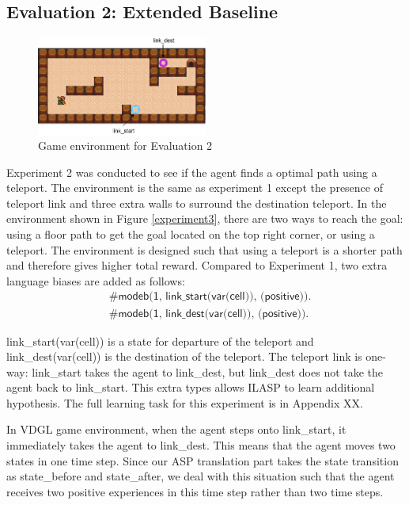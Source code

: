 \subsection{Evaluation 2: Extended Baseline}
\label{subsec:experiement2_setup}

\begin{figure}[!htb]
\centering
\includegraphics[width=0.5\textwidth]{./figures/experiment2_setup}
\caption{Game environment for Evaluation 2}
\label{experiment2}
\end{figure}
Experiment 2 was conducted to see if the agent finds a optimal path using a teleport. The environment is the same as experiment 1 except the presence of teleport link and three extra walls to surround the destination teleport.
In the environment shown in Figure \ref{experiment3},
there are two ways to reach the goal: using a floor path to get the goal located on the top right corner, or using a teleport.
The environment is designed such that using a teleport is a shorter path and therefore gives higher total reward.
Compared to Experiment 1, two extra language biases are added as follows:
\begin{equation*}
\begin{split}
&\textsf{\#modeb(1, link\_start(var(cell)), (positive)).}\\
&\textsf{\#modeb(1, link\_dest(var(cell)), (positive)).}
\end{split}
\end{equation*}

\textsf{link\_start(var(cell))} is a state for departure of the teleport and \textsf{link\_dest(var(cell))} is the destination of the teleport. 
The teleport link is one-way: \textsf{link\_start} takes the agent to \textsf{link\_dest}, but \textsf{link\_dest} does not take the agent back to \textsf{link\_start}.
This extra types allows ILASP to learn additional hypothesis.
The full learning task for this experiment is in Appendix XX.

In VDGL game environment, when the agent steps onto \textsf{link\_start}, it immediately takes the agent to \textsf{link\_dest}. This means that the agent moves two states in one time step.
Since our ASP translation part takes the state transition as \textsf{state\_before} and \textsf{state\_after}, 
we deal with this situation such that the agent receives two positive experiences in this time step rather than two time steps.

